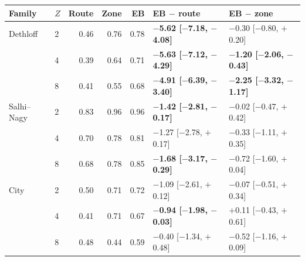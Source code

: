 \begin{tabular}{llrrrll}
\toprule
Family & $Z$ & Route & Zone & EB & EB $-$ route & EB $-$ zone \\
\midrule
Dethloff & 2 & 0.46 & 0.76 & 0.78 & \textbf{$-$5.62 [$-$7.18, $-$4.08]} & $-$0.30 [$-$0.80, $+$0.20] \\
 & 4 & 0.39 & 0.64 & 0.71 & \textbf{$-$5.63 [$-$7.12, $-$4.29]} & \textbf{$-$1.20 [$-$2.06, $-$0.43]} \\
 & 8 & 0.41 & 0.55 & 0.68 & \textbf{$-$4.91 [$-$6.39, $-$3.40]} & \textbf{$-$2.25 [$-$3.32, $-$1.17]} \\
\midrule
Salhi--Nagy & 2 & 0.83 & 0.96 & 0.96 & \textbf{$-$1.42 [$-$2.81, $-$0.17]} & $-$0.02 [$-$0.47, $+$0.42] \\
 & 4 & 0.70 & 0.78 & 0.81 & $-$1.27 [$-$2.78, $+$0.17] & $-$0.33 [$-$1.11, $+$0.35] \\
 & 8 & 0.68 & 0.78 & 0.85 & \textbf{$-$1.68 [$-$3.17, $-$0.29]} & $-$0.72 [$-$1.60, $+$0.04] \\
\midrule
City & 2 & 0.50 & 0.71 & 0.72 & $-$1.09 [$-$2.61, $+$0.12] & $-$0.07 [$-$0.51, $+$0.34] \\
 & 4 & 0.41 & 0.71 & 0.67 & \textbf{$-$0.94 [$-$1.98, $-$0.03]} & $+$0.11 [$-$0.43, $+$0.61] \\
 & 8 & 0.48 & 0.44 & 0.59 & $-$0.40 [$-$1.34, $+$0.48] & $-$0.52 [$-$1.16, $+$0.09] \\
\bottomrule
\end{tabular}
